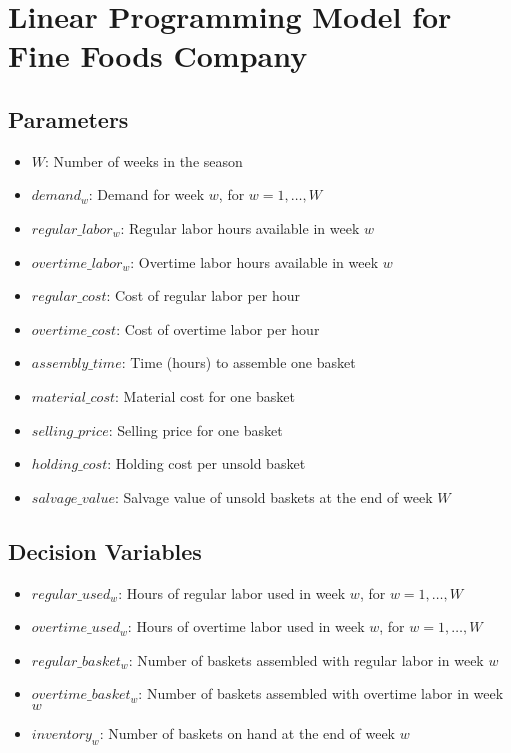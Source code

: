 \documentclass{article}
\begin{document}
\section*{Linear Programming Model for Fine Foods Company}

\subsection*{Parameters}
\begin{itemize}
    \item $W$: Number of weeks in the season
    \item $demand_{w}$: Demand for week $w$, for $w = 1, \ldots, W$
    \item $regular\_labor_{w}$: Regular labor hours available in week $w$
    \item $overtime\_labor_{w}$: Overtime labor hours available in week $w$
    \item $regular\_cost$: Cost of regular labor per hour
    \item $overtime\_cost$: Cost of overtime labor per hour
    \item $assembly\_time$: Time (hours) to assemble one basket
    \item $material\_cost$: Material cost for one basket
    \item $selling\_price$: Selling price for one basket
    \item $holding\_cost$: Holding cost per unsold basket
    \item $salvage\_value$: Salvage value of unsold baskets at the end of week $W$
\end{itemize}

\subsection*{Decision Variables}
\begin{itemize}
    \item $regular\_used_{w}$: Hours of regular labor used in week $w$, for $w = 1, \ldots, W$
    \item $overtime\_used_{w}$: Hours of overtime labor used in week $w$, for $w = 1, \ldots, W$
    \item $regular\_basket_{w}$: Number of baskets assembled with regular labor in week $w$
    \item $overtime\_basket_{w}$: Number of baskets assembled with overtime labor in week $w$
    \item $inventory_{w}$: Number of baskets on hand at the end of week $w$
\end{itemize}
\end{document}
